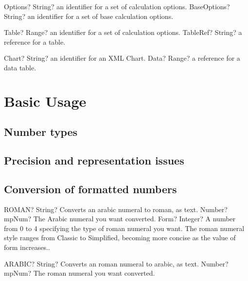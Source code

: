 \documentclass[12pt,a4paper,openany]{book}
\begin{document}
\begin{mpFunctionsExtract}
\mpFunctionOne
{Options? String?  an identifier for a set of calculation options.}
{BaseOptions? String? an identifier for a set of base calculation options.}
\end{mpFunctionsExtract}

\begin{mpFunctionsExtract}
\mpFunctionOne
{Table? Range?  an identifier for a set of calculation options.}
{TableRef? String? a reference for a table.}
\end{mpFunctionsExtract}

\begin{mpFunctionsExtract}
\mpFunctionOne
{Chart? String?  an identifier for an XML Chart.}
{Data? Range? a reference for a data table.}
\end{mpFunctionsExtract}

\chapter{Basic Usage}

\section{Number types}

\section{Precision and representation issues}

\section{Conversion of formatted numbers}

\begin{mpFunctionsExtract}
\mpWorksheetFunctionTwoNotImplemented
{ROMAN? String? Converts an arabic numeral to roman, as text.}
{Number? mpNum? The Arabic numeral you want converted.}
{Form? Integer? A number from 0 to 4 specifying the type of roman numeral you want. The roman numeral style ranges from Classic to Simplified, becoming more concise as the value of form increases..}
\end{mpFunctionsExtract}

\begin{mpFunctionsExtract}
\mpWorksheetFunctionOneNotImplemented
{ARABIC? String? Converts an roman numeral to arabic, as text.}
{Number? mpNum? The roman numeral you want converted.}
\end{mpFunctionsExtract}
\end{document}
